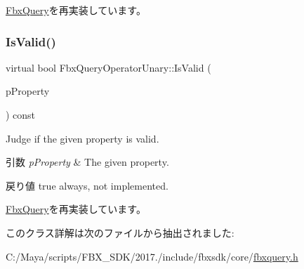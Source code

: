 \hyperlink{class_fbx_query_adfc24c7306ceed2fcfd8c67198e0c1dd}{Fbx\+Query}を再実装しています。

\mbox{\label{class_fbx_query_operator_unary_a4987590ec1680775240b813ec3b2ffb4}} 
\subsubsection{\texorpdfstring{Is\+Valid()}{IsValid()}}
{\footnotesize\ttfamily virtual bool Fbx\+Query\+Operator\+Unary\+::\+Is\+Valid (\begin{DoxyParamCaption}\item[{const \hyperlink{class_fbx_property}{Fbx\+Property} \&}]{p\+Property }\end{DoxyParamCaption}) const\hspace{0.3cm}{\ttfamily [virtual]}}

Judge if the given property is valid. 
\begin{DoxyParams}{引数}
{\em p\+Property} & The given property. \\
\hline
\end{DoxyParams}
\begin{DoxyReturn}{戻り値}
{\ttfamily true} always, not implemented. 
\end{DoxyReturn}


\hyperlink{class_fbx_query_a822776baf45a56d8e126e948ec25d920}{Fbx\+Query}を再実装しています。



このクラス詳解は次のファイルから抽出されました\+:\begin{DoxyCompactItemize}
\item 
C\+:/\+Maya/scripts/\+F\+B\+X\+\_\+\+S\+D\+K/2017./include/fbxsdk/core/\hyperlink{fbxquery_8h}{fbxquery.\+h}\end{DoxyCompactItemize}
